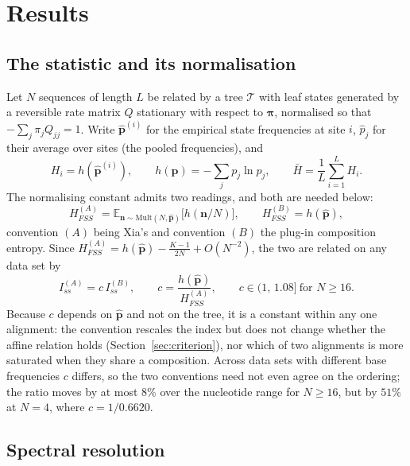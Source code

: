 \documentclass[11pt]{article}
\newcommand{\Iss}{I_{ss}}
\newcommand{\Hbar}{\bar H}
\newcommand{\HFSS}{H_{FSS}}
\newcommand{\bpi}{\boldsymbol{\pi}}
\newcommand{\E}{\mathbb{E}}
\newcommand{\Mult}{\mathrm{Mult}}
\theoremstyle{definition}
\theoremstyle{remark}
\begin{document}
\section{Results}

\subsection{The statistic and its normalisation}
\label{sec:setting}

Let $N$ sequences of length $L$ be related by a tree $\mathcal{T}$ with leaf
states generated by a reversible rate matrix $Q$ stationary with respect to
$\bpi$, normalised so that $-\sum_j\pi_jQ_{jj}=1$. Write
$\hat{\mathbf p}^{(i)}$ for the empirical state frequencies at site $i$,
$\hat p_j$ for their average over sites (the pooled frequencies), and
\begin{equation}
  H_i=h(\hat{\mathbf p}^{(i)}),\qquad h(\mathbf p)=-\sum_j p_j\ln p_j,\qquad
  \Hbar=\frac1L\sum_{i=1}^{L}H_i .
\end{equation}
The normalising constant admits two readings, and both are needed below:
\begin{equation}
  \HFSS^{(A)}=\E_{\mathbf n\sim\Mult(N,\hat{\mathbf p})}\bigl[h(\mathbf n/N)\bigr],
  \qquad \HFSS^{(B)}=h(\hat{\mathbf p}),
  \label{eq:conventions}
\end{equation}
convention $(A)$ being Xia's \citep{xia2003iss,xia2009handbook} and convention
$(B)$ the plug-in composition entropy. Since
$\HFSS^{(A)}=h(\hat{\mathbf p})-\frac{K-1}{2N}+O(N^{-2})$, the two are related
on any data set by
\begin{equation}
  \Iss^{(A)}=c\,\Iss^{(B)},\qquad
  c=\frac{h(\hat{\mathbf p})}{\HFSS^{(A)}},\qquad c\in(1,\,1.08]\ \text{for }N\ge16 .
  \label{eq:convention}
\end{equation}
Because $c$ depends on $\hat{\mathbf p}$ and not on the tree, it is a constant
within any one alignment: the convention rescales the index but does not
change whether the affine relation holds
(Section~\ref{sec:criterion}), nor which of two alignments is more saturated
when they share a composition. Across data sets with different base
frequencies $c$ differs, so the two conventions need not even agree on the
ordering; the ratio moves by at most $8\%$ over the nucleotide range for
$N\ge16$, but by $51\%$ at $N=4$, where $c=1/0.6620$.

\subsection{Spectral resolution}
\end{document}
